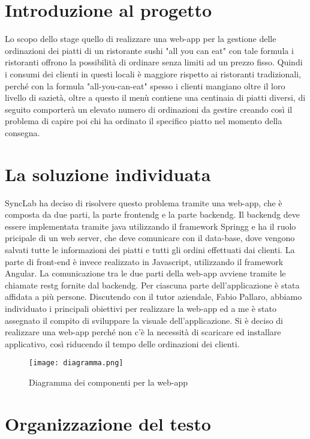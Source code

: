 \section{Introduzione al progetto}
Lo scopo dello stage quello di realizzare una web-app per la gestione delle ordinazioni dei piatti di un ristorante sushi "all you can eat" con tale formula i ristoranti offrono la possibilità di ordinare senza limiti ad un prezzo fisso. Quindi i consumi dei clienti in questi locali è maggiore rispetto ai ristoranti tradizionali, perché con la formula "all-you-can-eat" spesso i clienti mangiano oltre il loro livello di sazietà, oltre a questo il menù contiene una centinaia di piatti diversi, di seguito comporterà un elevato numero di ordinazioni da gestire creando così il problema di capire poi chi ha ordinato il specifico piatto nel momento della consegna.

\section{La soluzione individuata}
SyncLab ha deciso di risolvere questo problema tramite una web-app, che è composta da due parti, la parte \gls{frontendg} e la parte \gls{backendg}. Il \gls{backendg} deve essere implementata tramite java utilizzando il framework \gls{Springg} e ha il ruolo pricipale di un web server, che deve comunicare con il data-base, dove vengono salvati tutte le informazioni dei piatti e tutti gli ordini effettuati dai clienti.
La parte di front-end è invece realizzato in Javascript, utilizzando il framework Angular. La comunicazione tra le due parti della web-app avviene tramite le chiamate \gls{restg} fornite dal \gls{backendg}.
Per ciascuna parte dell'applicazione è stata affidata a più persone. Discutendo con il tutor aziendale, Fabio Pallaro, abbiamo individuato i principali obiettivi per realizzare la web-app ed a me è stato assegnato il compito di sviluppare la visuale dell'applicazione. 
Si è deciso di realizzare una web-app perché non c'è la necessità di scaricare ed installare applicativo, così riducendo il tempo delle ordinazioni dei clienti.

\begin{figure}[H]
    \centering
    \texttt{[image: diagramma.png]}
    \caption{Diagramma dei componenti per la web-app}
\end{figure}


\section{Organizzazione del testo}

